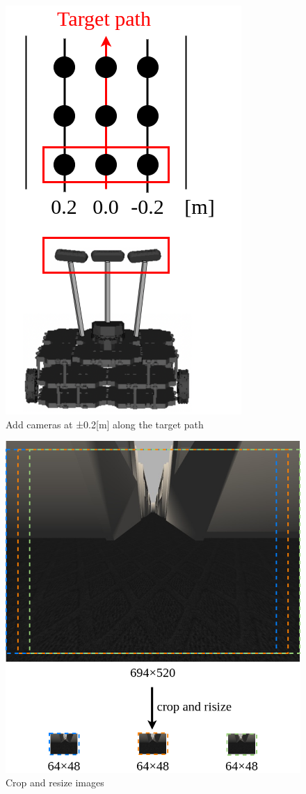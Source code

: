 \newpage
\begin{figure}[h]
  \centering
  \includegraphics[keepaspectratio, scale=0.31]{images/add_3cam.png}
  \caption{Add cameras at ±0.2[m] along the target path}
  \label{Fig:add-3cam}
\end{figure}

\begin{figure}[h]
  \centering
  \includegraphics[keepaspectratio, scale=0.28]{images/crop.png}
  \caption{Crop and resize images}
  \label{Fig:crop}
\end{figure}

